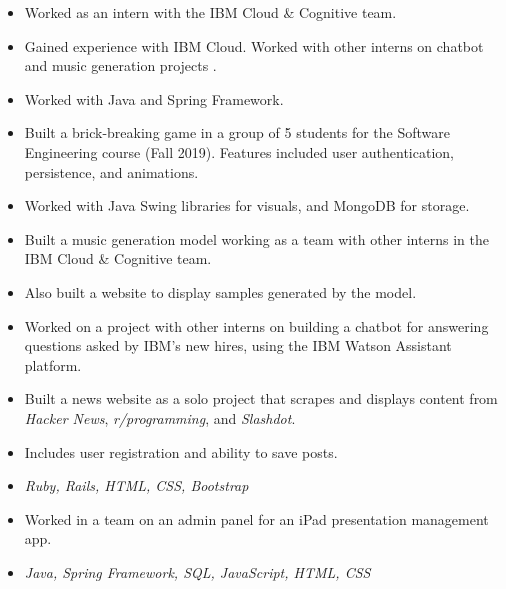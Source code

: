 
\begin{itemize}
    \item Worked as an intern with the IBM Cloud \& Cognitive team. 
    \item Gained experience with IBM Cloud. Worked with other interns on chatbot and music generation projects . 
\end{itemize}

\begin{itemize}
    \item Worked with Java and Spring Framework. 
\end{itemize}


\begin{itemize}
	\item Built a brick-breaking game in a group of 5 students for the Software Engineering course (Fall 2019). Features included user authentication, persistence, and animations.
	\item Worked with Java Swing libraries for visuals, and MongoDB for storage. 
\end{itemize}

\begin{itemize}
	\item Built a music generation model working as a team with other interns in the IBM Cloud \& Cognitive team.
	\item Also built a website to display samples generated by the model. 
\end{itemize}

\begin{itemize}
	\item Worked on a project with other interns on building a chatbot for answering questions asked by IBM's new hires, using the IBM Watson Assistant platform. 
\end{itemize}

\begin{itemize}
	\item Built a news website as a solo project that scrapes and displays content from \textit{Hacker News}, \textit{r/programming}, and \textit{Slashdot}.
	\item Includes user registration and ability to save posts.
	\item \textit{Ruby, Rails, HTML, CSS, Bootstrap}
\end{itemize}

\begin{itemize}
    \item Worked in a team on an admin panel for an iPad presentation management app.
    \item \textit{Java, Spring Framework, SQL, JavaScript, HTML, CSS}
\end{itemize}

    

